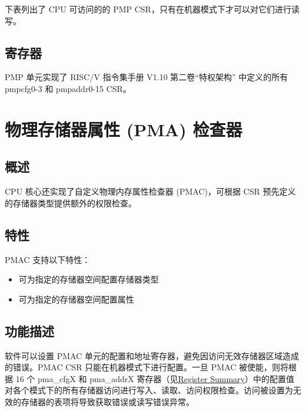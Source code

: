 \documentclass[main\_\_CN.tex]{subfiles}
\begin{document}
下表列出了 CPU 可访问的的 PMP CSR，只有在机器模式下才可以对它们进行读写。




\subsection{寄存器}
\label{sec:riscvcpu-pmp-reg-desc}

PMP 单元实现了 RISC\-/V 指令集手册 V1.10 第二卷“特权架构” 中定义的所有 pmpcfg0-3 和 pmpaddr0-15 CSR。


\clearpage
\section{物理存储器属性 (PMA) 检查器}
\label{sec:riscvcpu-pma}

\subsection{概述}
\label{sec:riscvcpu-pma-overview}
CPU 核心还实现了自定义物理内存属性检查器 (PMAC)，可根据 CSR 预先定义的存储器类型提供额外的权限检查。

\subsection{特性}
\label{sec:riscvcpu-pma-features}

PMAC 支持以下特性：

\begin{itemize}
    \item 可为指定的存储器空间配置存储器类型
    \item 可为指定的存储器空间配置属性
\end{itemize}

\subsection{功能描述}
\label{sec:riscvcpu-pma-func-descr}

软件可以设置 PMAC 单元的配置和地址寄存器，避免因访问无效存储器区域造成的错误。PMAC CSR 只能在机器模式下进行配置。一旦 PMAC 被使能，则将根据 16 个 pma\_cfgX 和 pma\_addrX 寄存器（见\hyperref[sec:riscvcpu-pma-reg-summ]{Register Summary}）中的配置值对各个模式下的所有存储器访问进行写入、读取、访问权限检查。访问被设置为无效的存储器的表项将导致获取错误或读写错误异常。
\end{document}
